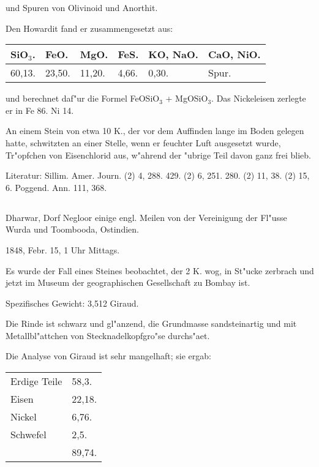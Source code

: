 \documentclass[a4paper, 11pt, oneside]{article}
\begin{document}
und Spuren von Olivinoid und Anorthit.

Den Howardit fand er zusammengesetzt aus:
\begin{table}[H]
    \centering\swabfamily\Large
    \begin{tabular}{l l l l l l}
        SiO$_{3}$. & FeO. & MgO. & FeS. & KO, NaO. & CaO, NiO.  \\ \hline
        60,13. & 23,50. & 11,20. & 4,66. & 0,30. & Spur. \\
    \end{tabular}
\end{table}

und berechnet daf"ur die Formel FeOSiO$_{3}$ + MgOSiO$_{3}$. Das Nickeleisen zerlegte er in Fe 86. Ni 14.

An einem Stein von etwa 10 K., der vor dem Auffinden lange im Boden gelegen hatte, schwitzten an einer Stelle, wenn er feuchter Luft ausgesetzt wurde, Tr"opfchen von Eisenchlorid aus, w"ahrend der "ubrige Teil davon ganz frei blieb.

\normalsize
Literatur: Sillim. Amer. Journ. (2) 4, 288. 429. (2) 6, 251. 280. (2) 11, 38. (2) 15, 6. Poggend. Ann. 111, 368.

\subsection{}
\LARGE
\paragraph{}
Dharwar, Dorf Negloor einige engl. Meilen von der Vereinigung der Fl"usse Wurda und Toombooda, Ostindien.

1848, Febr. 15, 1 Uhr Mittags.

Es wurde der Fall eines Steines beobachtet, der 2 K. wog, in St"ucke zerbrach und jetzt im Museum der geographischen Gesellschaft zu Bombay ist.

Spezifisches Gewicht: 3,512 Giraud.

Die Rinde ist schwarz und gl"anzend, die Grundmasse sandsteinartig und mit Metallbl"attchen von Stecknadelkopfgro"se durchs"aet.

Die Analyse von Giraud ist sehr mangelhaft; sie ergab:
\begin{table}[H]
    \centering\swabfamily\Large
    \begin{tabular}{l l}
        Erdige Teile & 58,3. \\
        Eisen & 22,18. \\
        Nickel & 6,76. \\
        Schwefel & 2,5. \\
         & 89,74. \\
    \end{tabular}
\end{table}
\end{document}
